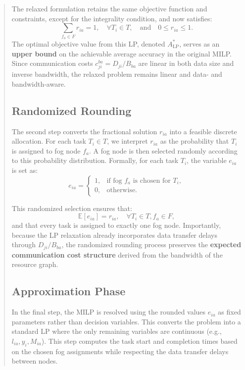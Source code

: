 \documentclass[conference]{IEEEtran}
\begin{document}
\begin{abstract}
The relaxed formulation retains the same objective function and constraints, except for the integrality condition, and now satisfies:
\[
\sum_{f_a \in F} r_{ia} = 1, \quad \forall T_i \in T, \quad \text{and} \quad 0 \leq r_{ia} \leq 1.
\]
The optimal objective value from this LP, denoted \( A_{\text{LP}}^* \), serves as an \textbf{upper bound} on the achievable average accuracy in the original MILP.  
Since communication costs \( c_{ji}^{ba} = D_{ji} / B_{ba} \) are linear in both data size and inverse bandwidth, the relaxed problem remains linear and data- and bandwidth-aware.

\subsection{Randomized Rounding}

The second step converts the fractional solution \( r_{ia} \) into a feasible discrete allocation.  
For each task \( T_i \in T \), we interpret \( r_{ia} \) as the probability that \( T_i \) is assigned to fog node \( f_a \).  
A fog node is then selected randomly according to this probability distribution.  
Formally, for each task \( T_i \), the variable \( e_{ia} \) is set as:
\[
e_{ia} =
\begin{cases}
1, & \text{if fog } f_a \text{ is chosen for } T_i, \\
0, & \text{otherwise.}
\end{cases}
\]

This randomized selection ensures that:
\[
\mathbb{E}[e_{ia}] = r_{ia}, \quad \forall T_i \in T, f_a \in F,
\]
and that every task is assigned to exactly one fog node.  
Importantly, because the LP relaxation already incorporates data transfer delays through \( D_{ji}/B_{ba} \), the randomized rounding process preserves the \textbf{expected communication cost structure} derived from the bandwidth of the resource graph.

\subsection{Approximation Phase}

In the final step, the MILP is resolved using the rounded values \( e_{ia} \) as fixed parameters rather than decision variables.  
This converts the problem into a standard LP where the only remaining variables are continuous (e.g., \( l_{ia}, y_i, M_{ia} \)).  
This step computes the task start and completion times based on the chosen fog assignments while respecting the data transfer delays between nodes.


\end{abstract}
\end{document}
